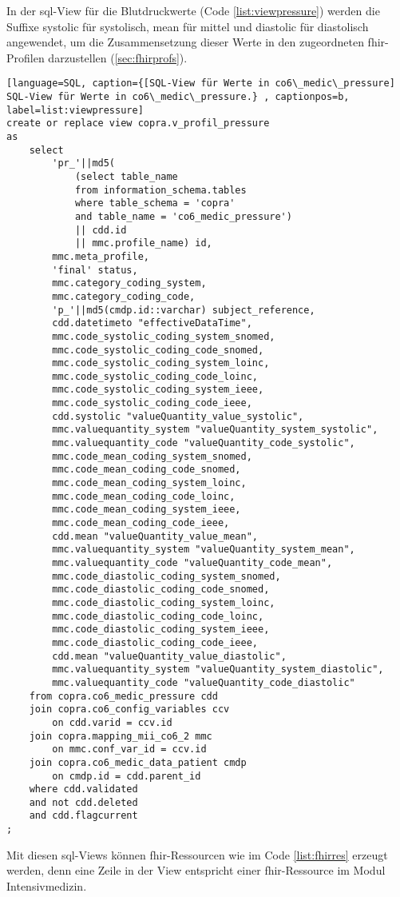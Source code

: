 In der \ac{sql}-View für die Blutdruckwerte (Code \ref{list:viewpressure}) werden die Suffixe \glqq systolic\grqq{} für systolisch, \glqq mean\grqq{} für mittel und \glqq diastolic\grqq{} für diastolisch angewendet, um die Zusammensetzung dieser Werte in den zugeordneten \ac{fhir}-Profilen darzustellen (\ref{sec:fhirprofs}). 

\begin{lstlisting}[language=SQL, caption={[SQL-View für Werte in co6\_medic\_pressure] SQL-View für Werte in co6\_medic\_pressure.} , captionpos=b, label=list:viewpressure]
create or replace view copra.v_profil_pressure 
as
	select 
		'pr_'||md5(
			(select table_name 
			from information_schema.tables 
			where table_schema = 'copra'
			and table_name = 'co6_medic_pressure') 
			|| cdd.id 
			|| mmc.profile_name) id,
		mmc.meta_profile,
		'final' status,
		mmc.category_coding_system,
		mmc.category_coding_code,  
		'p_'||md5(cmdp.id::varchar) subject_reference,
		cdd.datetimeto "effectiveDataTime",
		mmc.code_systolic_coding_system_snomed,
		mmc.code_systolic_coding_code_snomed,
		mmc.code_systolic_coding_system_loinc,
		mmc.code_systolic_coding_code_loinc,
		mmc.code_systolic_coding_system_ieee,
		mmc.code_systolic_coding_code_ieee,
		cdd.systolic "valueQuantity_value_systolic",
		mmc.valuequantity_system "valueQuantity_system_systolic",
		mmc.valuequantity_code "valueQuantity_code_systolic",
		mmc.code_mean_coding_system_snomed,
		mmc.code_mean_coding_code_snomed,
		mmc.code_mean_coding_system_loinc,
		mmc.code_mean_coding_code_loinc,
		mmc.code_mean_coding_system_ieee,
		mmc.code_mean_coding_code_ieee,
		cdd.mean "valueQuantity_value_mean",
		mmc.valuequantity_system "valueQuantity_system_mean",
		mmc.valuequantity_code "valueQuantity_code_mean",
		mmc.code_diastolic_coding_system_snomed,
		mmc.code_diastolic_coding_code_snomed,
		mmc.code_diastolic_coding_system_loinc,
		mmc.code_diastolic_coding_code_loinc,
		mmc.code_diastolic_coding_system_ieee,
		mmc.code_diastolic_coding_code_ieee,
		cdd.mean "valueQuantity_value_diastolic",
		mmc.valuequantity_system "valueQuantity_system_diastolic",
		mmc.valuequantity_code "valueQuantity_code_diastolic"
	from copra.co6_medic_pressure cdd 
	join copra.co6_config_variables ccv 
		on cdd.varid = ccv.id 
	join copra.mapping_mii_co6_2 mmc 
		on mmc.conf_var_id = ccv.id 
	join copra.co6_medic_data_patient cmdp 
		on cmdp.id = cdd.parent_id 
	where cdd.validated 
	and not cdd.deleted 
	and cdd.flagcurrent
;
\end{lstlisting}

Mit diesen \ac{sql}-Views können \ac{fhir}-Ressourcen wie im Code \ref{list:fhirres} erzeugt werden, denn eine Zeile in der View entspricht einer \ac{fhir}-Ressource im Modul \glqq Intensivmedizin\grqq{}.

